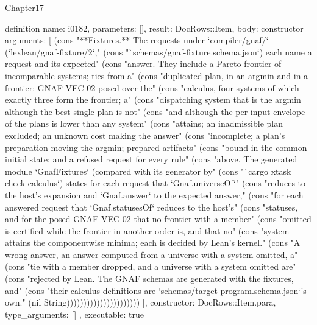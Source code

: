 \begin{lexlean}{Chapter17}
\begin{semanticmodule}
definition{
  name: i0182,
  parameters: [],
  result: DocRows::Item,
  body: constructor{
    arguments: [
      (cons "**Fixtures.** The requests under `compiler/gnaf/` (`lexlean/gnaf-fixture/2`," (cons "`schemas/gnaf-fixture.schema.json`) each name a request and its expected" (cons "answer. They include a Pareto frontier of incomparable systems; ties from a" (cons "duplicated plan, in an argmin and in a frontier; GNAF-VEC-02 posed over the" (cons "calculus, four systems of which exactly three form the frontier; a" (cons "dispatching system that is the argmin although the best single plan is not" (cons "and although the per-input envelope of the plans is lower than any system" (cons "attains; an inadmissible plan excluded; an unknown cost making the answer" (cons "incomplete; a plan's preparation moving the argmin; prepared artifacts" (cons "bound in the common initial state; and a refused request for every rule" (cons "above. The generated module `GnafFixtures` (compared with its generator by" (cons "`cargo xtask check-calculus`) states for each request that `Gnaf.universeOf`" (cons "reduces to the host's expansion and `Gnaf.answer` to the expected answer," (cons "for each answered request that `Gnaf.statusesOf` reduces to the host's" (cons "statuses, and for the posed GNAF-VEC-02 that no frontier with a member" (cons "omitted is certified while the frontier in another order is, and that no" (cons "system attains the componentwise minima; each is decided by Lean's kernel." (cons "A wrong answer, an answer computed from a universe with a system omitted, a" (cons "tie with a member dropped, and a universe with a system omitted are" (cons "rejected by Lean. The GNAF schemas are generated with the fixtures, and" (cons "their calculus definitions are `schemas/target-program.schema.json`'s own." (nil String))))))))))))))))))))))
    ],
    constructor: DocRows::Item.para,
    type_arguments: []
  },
  executable: true
}


\end{semanticmodule}
\end{lexlean}
